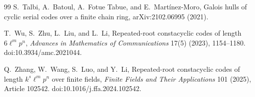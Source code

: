 \documentclass[10pt,journal,draftclsnofoot,onecolumn]{IEEEtran}
\theoremstyle{definition}
\theoremstyle{remark}
\begin{document}
\begin{thebibliography}{99}
S.~Talbi, A.~Batoul, A.~Fotue Tabue, and E.~Mart\'inez-Moro,
Galois hulls of cyclic serial codes over a finite chain ring,
arXiv:2102.06995 (2021).

T.~Wu, S.~Zhu, L.~Liu, and L.~Li,
Repeated-root constacyclic codes of length \(6\ell^m p^n\),
\emph{Advances in Mathematics of Communications} 17(5) (2023),
1154--1180. doi:10.3934/amc.2021044.

Q.~Zhang, W.~Wang, S.~Luo, and Y.~Li,
Repeated-root constacyclic codes of length \(k^s\ell^m p^n\) over
finite fields,
\emph{Finite Fields and Their Applications} 101 (2025), Article 102542.
doi:10.1016/j.ffa.2024.102542.

\end{thebibliography}
\end{document}
